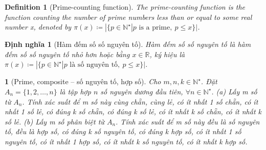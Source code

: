 \documentclass{article}
\newtheorem{baitoan}{}
\newtheorem{definition}{Definition}
\newtheorem{dinhnghia}{Định nghĩa}
\begin{document}
\begin{definition}[Prime-counting function]
	The {\rm prime-counting function} is the function counting the number of prime numbers less than or equal to some real number x, denoted by $\pi(x)\coloneqq|\{p\in\mathbb{N}^\star|p \mbox{ is a prime},\ p\le x\}|$.
\end{definition}

\begin{dinhnghia}[Hàm đếm số số nguyên tố]
	{\rm Hàm đếm số số nguyên tố} là hàm đếm số số nguyên tố nhỏ hơn hoặc bằng $x\in\mathbb{R}$, ký hiệu là $\pi(x)\coloneqq|\{p\in\mathbb{N}^\star|p \mbox{ là số nguyên tố},\ p\le x\}|$.
\end{dinhnghia}

\begin{baitoan}[Prime, composite -- số nguyên tố, hợp số]
	Cho $m,n,k\in\mathbb{N}^\star$. Đặt $A_n = \{1,2,\ldots,n\}$ là tập hợp $n$ số nguyên dương đầu tiên, $\forall n\in\mathbb{N}^\star$. (a) Lấy m số từ $A_n$. Tính xác suất để m số này cùng chẵn, cùng lẻ, có ít nhất 1 số chẵn, có ít nhất 1 số lẻ, có đúng k số chẵn, có đúng k số lẻ, có ít nhất k số chẵn, có ít nhất k số lẻ. (b) Lấy m số phân biệt từ $A_n$. Tính xác suất để m số này đều là số nguyên tố, đều là hợp số, có đúng k số nguyên tố, có đúng k hợp số, có ít nhất 1 số nguyên tố, có ít nhất 1 hợp số, có ít nhất k số nguyên tố, có ít nhất k hợp số.
\end{baitoan}


\printbibliography[heading=bibintoc]
	
\end{document}
